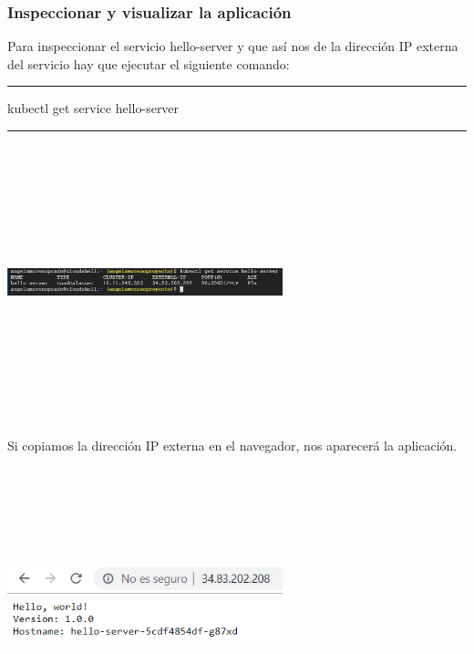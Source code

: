 \documentclass[english,runningheads,a4paper]{llncs}[2018/03/10]
\newenvironment{nscenter}
 {\parskip=0pt\par\nopagebreak\centering}
 {\par\noindent\ignorespacesafterend}
\begin{document}
\subsubsection*{Inspeccionar y visualizar la aplicación}
Para inspeccionar el servicio hello-server y que así nos de la dirección IP 
externa del servicio hay que ejecutar el siguiente comando:
\begin{nscenter}


\noindent\rule{10cm}{0.4pt}

kubectl get service hello-server

\noindent\rule{10cm}{0.4pt}
\end{nscenter}
\newline
\begin{nscenter}
\includegraphics[width=8cm,height=8cm,keepaspectratio]{./Contenedores/Googlecloud/47.png}
\end{nscenter}
\newline
Si copiamos la dirección IP externa en el navegador, nos aparecerá la aplicación.
\newline
\begin{nscenter}
\includegraphics[width=8cm,height=8cm,keepaspectratio]{./Contenedores/Googlecloud/48.png}
\end{nscenter}
\end{document}
